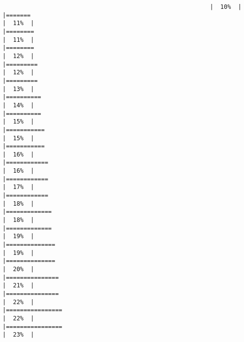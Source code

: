 \documentclass[
]{article}
\begin{document}
\begin{verbatim}
                                                           |  10%  |                                                                              |=======                                                               |  11%  |                                                                              |========                                                              |  11%  |                                                                              |========                                                              |  12%  |                                                                              |=========                                                             |  12%  |                                                                              |=========                                                             |  13%  |                                                                              |==========                                                            |  14%  |                                                                              |==========                                                            |  15%  |                                                                              |===========                                                           |  15%  |                                                                              |===========                                                           |  16%  |                                                                              |============                                                          |  16%  |                                                                              |============                                                          |  17%  |                                                                              |============                                                          |  18%  |                                                                              |=============                                                         |  18%  |                                                                              |=============                                                         |  19%  |                                                                              |==============                                                        |  19%  |                                                                              |==============                                                        |  20%  |                                                                              |===============                                                       |  21%  |                                                                              |===============                                                       |  22%  |                                                                              |================                                                      |  22%  |                                                                              |================                                                      |  23%  |                                                                              
\end{verbatim}
\end{document}
